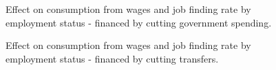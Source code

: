 \begin{figure}[H]
\caption[Caption for LOF]{Effect on consumption from wages and job finding rate by employment status - financed by cutting government spending.}
\label{fig:lower_b_C_decomp_by_N_G}
\end{figure}


\begin{figure}[H]
\caption[Caption for LOF]{Effect on consumption from wages and job finding rate by employment status - financed by cutting transfers.}
\label{fig:lower_b_C_decomp_by_N_T}
\end{figure}



